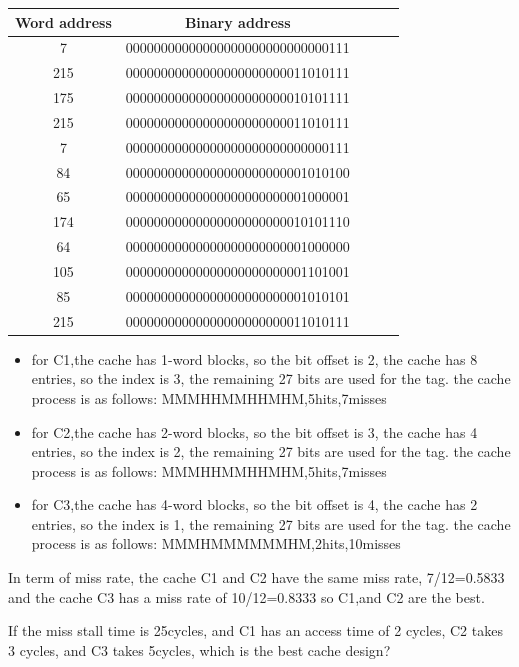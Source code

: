 \documentclass[cn,12pt]{homework}
\begin{document}
\begin{solution}
  

\begin{center}
\begin{tabular}{|c|c|c|c|c|}
\hline
Word address & Binary address  \\
\hline
7   & 00000000000000000000000000000111 \\
215 & 00000000000000000000000011010111 \\
175 & 00000000000000000000000010101111 \\
215 & 00000000000000000000000011010111 \\
7   & 00000000000000000000000000000111 \\
84  & 00000000000000000000000001010100 \\
65  & 00000000000000000000000001000001 \\
174 & 00000000000000000000000010101110 \\
64  & 00000000000000000000000001000000 \\
105 & 00000000000000000000000001101001 \\
85  & 00000000000000000000000001010101 \\
215 & 00000000000000000000000011010111 \\ 
\hline
\end{tabular}
\end{center}

\begin{itemize}
  \item for C1,the cache has 1-word blocks, so the bit offset is 2, 
  the cache has 8 entries, so the index is 3, the remaining 27 bits are used for the tag.
  the cache process is as follows: MMMHHMMHHMHM,5hits,7misses
  \item for C2,the cache has 2-word blocks, so the bit offset is 3,
  the cache has 4 entries, so the index is 2, the remaining 27 bits are used for the tag.
  the cache process is as follows: MMMHHMMHHMHM,5hits,7misses
  \item for C3,the cache has 4-word blocks, so the bit offset is 4,
  the cache has 2 entries, so the index is 1, the remaining 27 bits are used for the tag.
  the cache process is as follows: MMMHMMMMMMHM,2hits,10misses
\end{itemize}

In term of miss rate, the cache C1 and C2 have the same miss rate, 7/12=0.5833 and the cache C3 has a miss rate of 10/12=0.8333
so C1,and C2 are the best.

If the miss stall time is 25cycles, and C1 has an access time of 2 cycles, C2 takes 3 cycles, and C3 takes 5cycles, which is the best cache design?


\end{solution}
\end{document}
